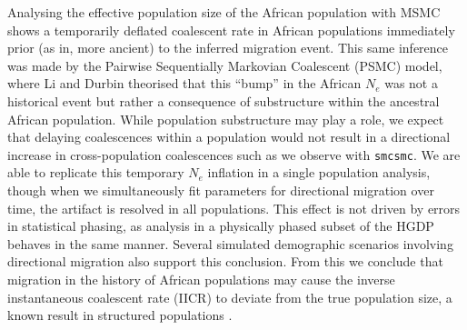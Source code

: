\documentclass{article}
\begin{document}
Analysing the effective population size of the African population with MSMC shows a temporarily deflated coalescent rate in African populations immediately prior (as in, more ancient) to the inferred migration event. This same inference was made by the Pairwise Sequentially Markovian Coalescent (PSMC) model, where Li and Durbin theorised that this ``bump'' in the African $N_e$ was not a historical event but rather a consequence of substructure within the ancestral African population. While population substructure may play a role, we expect that delaying coalescences within a population would not result in a directional increase in cross-population coalescences such as we observe with {\tt smcsmc}. We are able to replicate this temporary $N_e$ inflation in a single population analysis, though when we simultaneously fit parameters for directional migration over time, the artifact is resolved in all populations. This effect is not driven by errors in statistical phasing, as analysis in a physically phased subset of the HGDP behaves in the same manner. Several simulated demographic scenarios involving directional migration also support this conclusion. From this we conclude that migration in the history of African populations may cause the inverse instantaneous coalescent rate (IICR) to deviate from the true population size, a known result in structured populations \cite{Chikhi2018}.
\end{document}
